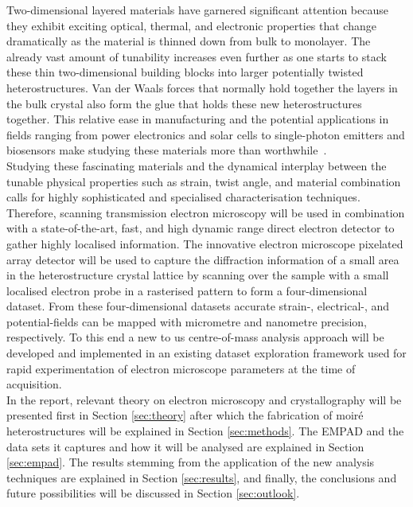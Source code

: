 Two-dimensional layered materials have garnered significant attention because they exhibit exciting optical, thermal, and electronic properties that change dramatically as the material is thinned down from bulk to monolayer. The already vast amount of tunability increases even further as one starts to stack these thin two-dimensional building blocks into larger potentially twisted heterostructures. Van der Waals forces that normally hold together the layers in the bulk crystal also form the glue that holds these new heterostructures together. This relative ease in manufacturing and the potential applications in fields ranging from power electronics and solar cells to single-photon emitters and biosensors make studying these materials more than worthwhile~\cite{LI2016322, https://doi.org/10.1002/smll.202107059}.\\
Studying these fascinating materials and the dynamical interplay between the tunable physical properties such as strain, twist angle, and material combination calls for highly sophisticated and specialised characterisation techniques. Therefore, scanning transmission electron microscopy will be used in combination with a state-of-the-art, fast, and high dynamic range direct electron detector to gather highly localised information. The innovative electron microscope pixelated array detector will be used to capture the diffraction information of a small area in the heterostructure crystal lattice by scanning over the sample with a small localised electron probe in a rasterised pattern to form a four-dimensional dataset. From these four-dimensional datasets accurate strain-, electrical-, and potential-fields can be mapped with micrometre and nanometre precision, respectively. To this end a new to us centre-of-mass analysis approach will be developed and implemented in an existing dataset exploration framework used for rapid experimentation of electron microscope parameters at the time of acquisition.\\
In the report, relevant theory on electron microscopy and crystallography will be presented first in Section \ref{sec:theory} after which the fabrication of moiré heterostructures will be explained in Section \ref{sec:methods}. The EMPAD and the data sets it captures and how it will be analysed are explained in Section \ref{sec:empad}. The results stemming from the application of the new analysis techniques are explained in Section \ref{sec:results}, and finally, the conclusions and future possibilities will be discussed in Section \ref{sec:outlook}.

